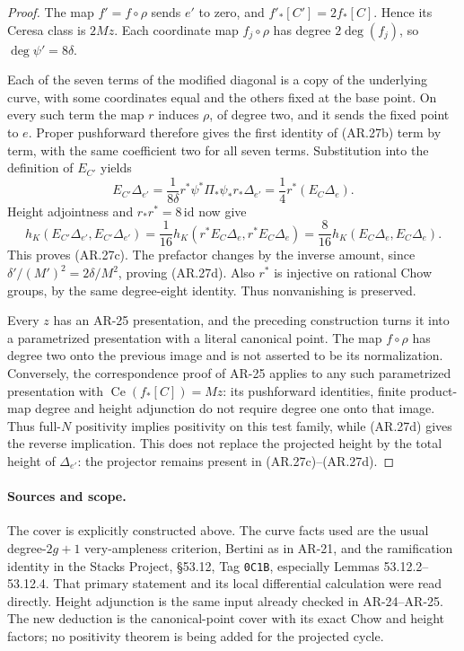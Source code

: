 \begin{proof}
The map $f'=f\circ\rho$ sends $e'$ to zero, and
$f'_*[C']=2f_*[C]$.  Hence its Ceresa class is $2Mz$.
Each coordinate map $f_j\circ\rho$ has degree $2\deg(f_j)$,
so $\deg\psi'=8\delta$.

Each of the seven terms of the modified diagonal is a copy of
the underlying curve, with some coordinates equal and the others
fixed at the base point.  On every such term the map $r$ induces
$\rho$, of degree two, and it sends the fixed point to $e$.
Proper pushforward therefore gives the first identity of
(AR.27b) term by term, with the same coefficient two for all
seven terms.  Substitution into the definition of $E_{C'}$ yields
\[
 E_{C'}\Delta_{e'}
   =\frac1{8\delta}r^*\psi^*\Pi_*\psi_*r_*\Delta_{e'}
   =\frac14r^*(E_C\Delta_e).
\]
Height adjointness and $r_*r^*=8\,\mathrm{id}$ now give
\[
 h_K(E_{C'}\Delta_{e'},E_{C'}\Delta_{e'})
 =\frac1{16}h_K(r^*E_C\Delta_e,r^*E_C\Delta_e)
 =\frac8{16}h_K(E_C\Delta_e,E_C\Delta_e).
\]
This proves (AR.27c).  The prefactor changes by the inverse
amount, since $\delta'/(M')^2=2\delta/M^2$, proving (AR.27d).
Also $r^*$ is injective on rational Chow groups, by the same
degree-eight identity.  Thus nonvanishing is preserved.

Every $z$ has an AR-25 presentation, and the preceding construction
turns it into a parametrized presentation with a literal canonical
point.  The map $f\circ\rho$ has degree two onto the previous
image and is not asserted to be its normalization.  Conversely,
the correspondence proof of AR-25 applies to any such parametrized
presentation with $\operatorname{Ce}(f_*[C])=Mz$: its pushforward
identities, finite product-map degree and height adjunction do not
require degree one onto that image.  Thus full-$N$ positivity implies
positivity on this test family, while (AR.27d) gives the reverse
implication.  This does not replace the
projected height by the total height of $\Delta_{e'}$: the
projector remains present in (AR.27c)--(AR.27d).
\end{proof}

\paragraph{Sources and scope.}
The cover is explicitly constructed above.  The curve facts used
are the usual degree-$2g+1$ very-ampleness criterion, Bertini as
in AR-21, and the ramification identity in the Stacks Project,
\S53.12, Tag \texttt{0C1B}, especially Lemmas 53.12.2--53.12.4.
That primary statement and its local differential calculation were
read directly.  Height adjunction is the same input already
checked in AR-24--AR-25.  The new deduction is the canonical-point
cover with its exact Chow and height factors; no positivity
theorem is being added for the projected cycle.
